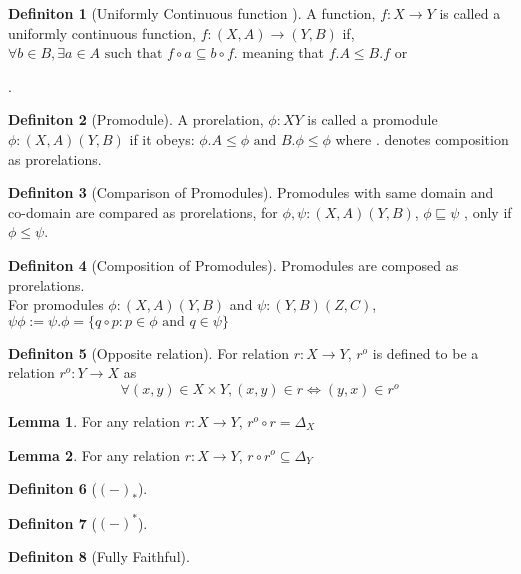 \documentclass[18pt,a4paper]{article}
\makeatletter
\theoremstyle{definition}
\newtheorem{definition}{Definiton}[section]
\newtheorem{lemma}{Lemma}[definition]
\newcommand\cen[2][\leq]{\arrow[mysymbol]{#2}[description]{#1}}
\newcommand{\carrow}{}%
\DeclareRobustCommand{\carrow}{%
  \mathrel{\vphantom{\rightarrow}\mathpalette\circle@arrow\relax}%
}
\newcommand{\circle@arrow}[2]{%
  \m@th
  \ooalign{%
    \hidewidth$#1\circ\mkern1mu$\hidewidth\cr
    $#1\longrightarrow$\cr}%
}
\makeatother
\begin{document}
\begin{definition}[Uniformly Continuous function ] %
	A function, $f:X \to Y$ is called a uniformly continuous function, $f:(X,A) \to (Y,B)$
	if, $\forall b \in B, \exists a \in A \text{ such that } f \circ a \subseteq b \circ f $.
	meaning that $f.A \leq B.f$ or
	.

\end{definition}
\begin{definition}[Promodule] %
	A prorelation, $\phi:X \carrow Y$ is called a promodule $\phi: (X,A) \carrow (Y,B)$  if it obeys:
	$ \phi.A \leq \phi \text{ and } B. \phi \leq \phi $ where . denotes composition as prorelations.
\end{definition}
\begin{definition}[Comparison of Promodules] %
	Promodules with same domain and co-domain are compared as prorelations, for
	$\phi,\psi:(X,A)\carrow (Y,B)$, $\phi \sqsubseteq \psi$ , only if $\phi \leq \psi$.
\end{definition}
\begin{definition}[Composition of Promodules] %
	Promodules are composed as prorelations.\\
	For promodules $\phi: (X,A) \carrow (Y,B)$ and $\psi:(Y,B)\carrow(Z,C)$,
	$\psi \phi := \psi.\phi = \{q \circ p :p\in \phi \text{ and } q \in \psi \}$
\end{definition}
\begin{definition}[Opposite relation] %
For relation $r:X \to Y$, $r^o$ is defined to be a relation $r^o:Y \to X$ as
\[ \forall (x,y)\in X \times Y, (x,y)\in r \iff (y,x) \in r^o \]
\end{definition}
\begin{lemma}
	For any relation $r:X \to Y$, $r^o \circ r = \Delta_X$
\end{lemma}
\begin{lemma}
	For any relation $r:X \to Y$, $r \circ r^o \subseteq \Delta_Y$
\end{lemma}
\begin{definition}[$(-)_*$] %

\end{definition}
\begin{definition}[$(-)^*$] %

\end{definition}
\begin{definition}[Fully Faithful] %

\end{definition}
\end{document}
